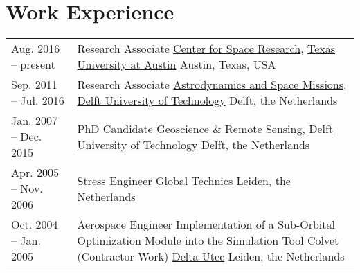 \documentclass[a4paper]{article}
\newlength{\listskipbig}
\newenvironment{cvsection}[2]{
  \vspace{0.15in}
  \section*{#1}
  \vspace{-0.2in}
  \begin{longtable}{lp{#2}}
}{
  \end{longtable}
}
\begin{document}



\begin{cvsection}{Work Experience}{10.8cm}

Aug. 2016 -- present
  & Research Associate\newline
    \href{http://www.csr.utexas.edu}{Center for Space Research}, \href{http://www.utexas.edu}{Texas University at Austin}\newline
    Austin, Texas, USA\\[\listskipbig]

Sep. 2011 -- Jul. 2016
  & Research Associate\newline
    \href{http://www.as.lr.tudelft.nl}{Astrodynamics and Space Missions}, \href{http://www.tudelft.nl/}{Delft University of Technology}\newline
    Delft, the Netherlands\\[\listskipbig]

Jan. 2007 -- Dec. 2015
  & PhD Candidate\newline
    \href{http://www.citg.tudelft.nl/over-faculteit/afdelingen/geoscience-and-remote-sensing/}{Geoscience \& Remote Sensing}, \href{http://www.tudelft.nl/}{Delft University of Technology}\newline
    Delft, the Netherlands\\[\listskipbig]

Apr. 2005 -- Nov. 2006
  & Stress Engineer\newline
    \href{http://www.globaltechnics.nl/}{Global Technics}\newline
    Leiden, the Netherlands\\[\listskipbig]


Oct. 2004 -- Jan. 2005
  & Aerospace Engineer\newline
  Implementation of a Sub-Orbital Optimization Module into the Simulation Tool Colvet (Contractor Work)\newline
  \href{http://www.delta-utec.com/}{Delta-Utec}\newline
  Leiden, the Netherlands\\[\listskipbig]


\end{cvsection}
\end{document}
